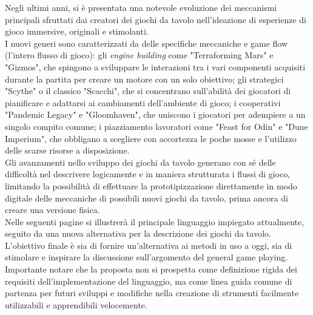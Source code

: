 Negli ultimi anni, si è presentata una notevole evoluzione dei meccanismi principali sfruttati dai
creatori dei giochi da tavolo nell'ideazione di esperienze di gioco immersive, originali e stimolanti. \\
I nuovi generi sono caratterizzati da delle specifiche meccaniche e game flow (l'intero flusso di gioco):
gli \emph{engine building} come "Terraforming Mars" e "Gizmos", che spingono a sviluppare le interazioni 
tra i vari componenti acquisiti durante la partita per creare un motore con un solo obiettivo;
gli strategici "Scythe" o il classico "Scacchi", che si concentrano sull'abilità dei giocatori di pianificare 
e adattarsi ai cambiamenti dell'ambiente di gioco; i cooperativi "Pandemic Legacy" e "Gloomhaven", che uniscono i giocatori per adempiere a un 
singolo compito comune; i piazziamento lavoratori come "Feast for Odin" e "Dune Imperium", che obbligano a scegliere 
con accortezza le poche mosse e l'utilizzo delle scarse risorse a disposizione. \\
Gli avanzamenti nello sviluppo dei giochi da tavolo generano con sé delle difficoltà nel descrivere logicamente 
e in maniera strutturata i flussi di gioco, limitando la possibilità di effettuare la prototipizzazione 
direttamente in modo digitale delle meccaniche di possibili nuovi giochi da tavolo, 
prima ancora di creare una versione fisica. \\
Nelle seguenti pagine si illustrerà il principale linguaggio impiegato attualmente, 
seguito da una nuova alternativa per la descrizione dei giochi da tavolo. \\
L’obiettivo finale è sia di fornire un’alternativa ai metodi in uso a oggi, 
sia di stimolare e inspirare la discussione sull’argomento del general game playing. \\
Importante notare che la proposta non si prospetta come definizione rigida dei requisiti dell’implementazione 
del linguaggio, ma come linea guida comune di partenza per futuri sviluppi e
modifiche nella creazione di strumenti facilmente utilizzabili e apprendibili velocemente. 

